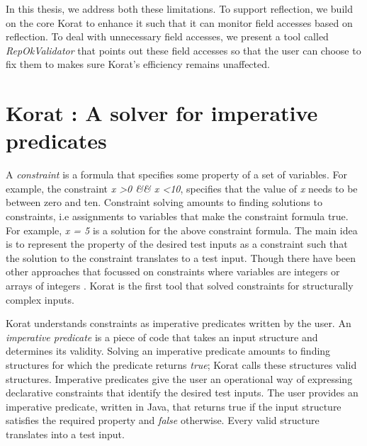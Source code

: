\para
In this thesis, we address both these limitations.  To support reflection, we build on the core Korat to enhance it such that it can monitor field accesses based on reflection.  To deal with unnecessary field accesses, we present a tool called \emph{RepOkValidator} that points out these field accesses so that the user can choose to fix them to makes sure Korat’s efficiency remains unaffected. 


\section{Korat : A solver for imperative predicates}
A \emph{constraint} is a formula that specifies some property of a set of variables. For example, the constraint \emph{x \textgreater 0 \&\& x \textless 10}, specifies that the value of \emph{x} needs to be between zero and ten. Constraint solving amounts to finding solutions to constraints, i.e assignments to variables that make the constraint formula true. For example, \emph{x = 5} is a solution for the above constraint formula. The main idea is to represent the property of the desired test inputs as a constraint such that the solution to the constraint translates to a test input. Though there have been other approaches that focussed on constraints where variables are integers or arrays of integers \cite{demilli1991constraint,huang1975approach,king1976symbolic,korel1996automated}. Korat \cite{boyapati2002korat} is the first tool that solved constraints for structurally complex inputs.

\para
Korat understands constraints as imperative predicates written by the user. An \emph{imperative predicate} is a piece of code that takes an input structure and determines its validity. Solving an imperative predicate amounts to finding structures for which the predicate returns \emph{true}; Korat calls these structures valid structures. Imperative predicates give the user an operational way of expressing declarative constraints that identify the desired test inputs. The user provides an imperative predicate, written in Java, that returns true if the input structure satisfies the required property and \emph{false} otherwise. Every valid structure translates into a test input.

